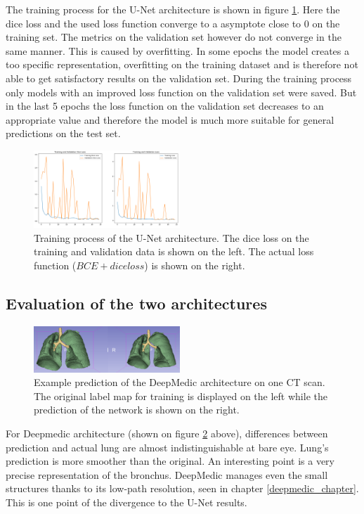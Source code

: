 The training process for the U-Net architecture is shown in figure \ref{train_unet}. Here the dice loss and the used loss function converge to a asymptote close to 0 on the training set. The metrics on the validation set however do not converge in the same manner. This is caused by overfitting. In some epochs the model creates a too specific representation, overfitting on the training dataset and is therefore not able to get satisfactory results on the validation set. During the training process only models with an improved loss function on the validation set were saved. But in the last 5 epochs the loss function on the validation set decreases to an appropriate value and therefore the model is much more suitable for general predictions on the test set.

\begin{figure}[h!]
	\includegraphics[width=0.49\textwidth, angle=0]{files/jpgunettrain.png}
	\caption{Training process of the U-Net architecture. The dice loss on the training and validation data is shown on the left. The actual loss function ($BCE + dice loss$) is shown on the right.}
	\label{train_unet}
\end{figure}

\subsection{Evaluation of the two architectures}

\begin{figure}[h!]
	\includegraphics[width=0.49\textwidth, angle=0]{files/preddeepmedic.png}
	\caption{Example prediction of the DeepMedic architecture on one CT scan. The original label map for training is displayed on the left while the prediction of the network is shown on the right.}
	\label{pred_deepmedic}
\end{figure}

For Deepmedic architecture (shown on figure \ref{pred_deepmedic} above), differences between prediction and actual lung are almost indistinguishable at bare eye. Lung's prediction is more smoother than the original. An interesting point is a very precise representation of the bronchus. DeepMedic manages even the small structures thanks to its low-path resolution, seen in chapter \ref{deepmedic_chapter}. This is one point of the divergence to the U-Net results.\newline


